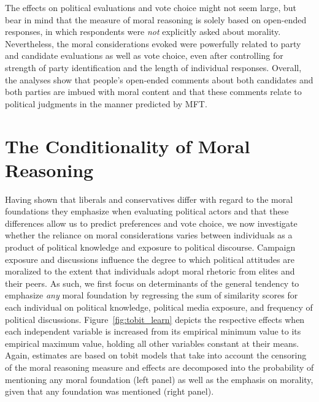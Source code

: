 \documentclass[12pt]{article}
\begin{document}
The effects on political evaluations and vote choice might not seem large, but bear in mind that the measure of moral reasoning is solely based on open-ended responses, in which respondents were \textit{not} explicitly asked about morality. Nevertheless, the moral considerations evoked were powerfully related to party and candidate evaluations as well as vote choice, even after controlling for strength of party identification and the length of individual responses. Overall, the analyses show that people's open-ended comments about both candidates and both parties are imbued with moral content and that these comments relate to political judgments in the manner predicted by MFT.


\section*{The Conditionality of Moral Reasoning}

Having shown that liberals and conservatives differ with regard to the moral foundations they emphasize when evaluating political actors and that these differences allow us to predict preferences and vote choice, we now investigate whether the reliance on moral considerations varies between individuals as a product of political knowledge and exposure to political discourse. Campaign exposure and discussions influence the degree to which political attitudes are moralized to the extent that individuals adopt moral rhetoric from elites and their peers. As such, we first focus on determinants of the general tendency to emphasize \textit{any} moral foundation by regressing the sum of similarity scores for each individual on political knowledge, political media exposure, and frequency of political discussions. Figure~\ref{fig:tobit_learn} depicts the respective effects when each independent variable is increased from its empirical minimum value to its empirical maximum value, holding all other variables constant at their means. Again, estimates are based on tobit models that take into account the censoring of the moral reasoning measure and effects are decomposed into the probability of mentioning any moral foundation (left panel) as well as the emphasis on morality, given that any foundation was mentioned (right panel).
\end{document}

